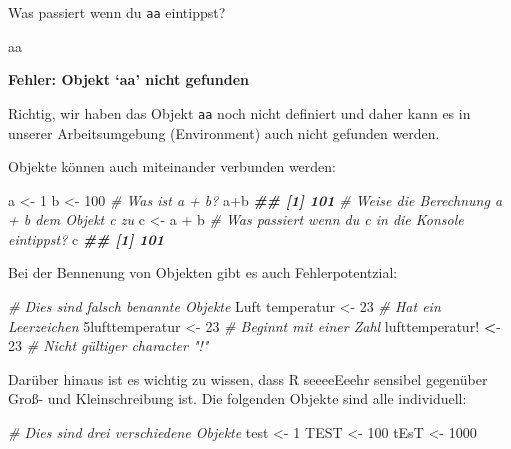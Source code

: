 \documentclass[
]{article}
\newenvironment{Shaded}{\begin{snugshade}}{\end{snugshade}}
\newcommand{\CommentTok}[1]{\textcolor[rgb]{0.56,0.35,0.01}{\textit{#1}}}
\newcommand{\DecValTok}[1]{\textcolor[rgb]{0.00,0.00,0.81}{#1}}
\newcommand{\DocumentationTok}[1]{\textcolor[rgb]{0.56,0.35,0.01}{\textbf{\textit{#1}}}}
\newcommand{\ErrorTok}[1]{\textcolor[rgb]{0.64,0.00,0.00}{\textbf{#1}}}
\newcommand{\NormalTok}[1]{#1}
\newcommand{\OtherTok}[1]{\textcolor[rgb]{0.56,0.35,0.01}{#1}}
\newcommand{\SpecialCharTok}[1]{\textcolor[rgb]{0.00,0.00,0.00}{#1}}
\begin{document}
Was passiert wenn du \texttt{aa} eintippst?

\begin{Shaded}
\begin{Highlighting}[]
\NormalTok{aa}
\end{Highlighting}
\end{Shaded}

\textbf{Fehler: Objekt `aa' nicht gefunden}

Richtig, wir haben das Objekt \texttt{aa} noch nicht definiert und daher kann es in unserer Arbeitsumgebung (Environment) auch nicht gefunden werden.

Objekte können auch miteinander verbunden werden:

\begin{Shaded}
\begin{Highlighting}[]
\NormalTok{a }\OtherTok{\textless{}{-}} \DecValTok{1}
\NormalTok{b }\OtherTok{\textless{}{-}} \DecValTok{100}
\CommentTok{\# Was ist a + b?}
\NormalTok{a}\SpecialCharTok{+}\NormalTok{b}
\DocumentationTok{\#\# [1] 101}
\CommentTok{\# Weise die Berechnung a + b dem Objekt c zu }
\NormalTok{c }\OtherTok{\textless{}{-}}\NormalTok{ a }\SpecialCharTok{+}\NormalTok{ b}
\CommentTok{\# Was passiert wenn du c in die Konsole eintippst?}
\NormalTok{c}
\DocumentationTok{\#\# [1] 101}
\end{Highlighting}
\end{Shaded}

Bei der Bennenung von Objekten gibt es auch Fehlerpotentzial:

\begin{Shaded}
\begin{Highlighting}[]
\CommentTok{\# Dies sind falsch benannte Objekte}
\NormalTok{Luft temperatur }\OtherTok{\textless{}{-}} \DecValTok{23} \CommentTok{\# Hat ein Leerzeichen}
\NormalTok{5lufttemperatur }\OtherTok{\textless{}{-}} \DecValTok{23} \CommentTok{\# Beginnt mit einer Zahl}
\NormalTok{lufttemperatur}\SpecialCharTok{!} \ErrorTok{\textless{}}\SpecialCharTok{{-}} \DecValTok{23} \CommentTok{\# Nicht gültiger character "!"}
\end{Highlighting}
\end{Shaded}

Darüber hinaus ist es wichtig zu wissen, dass R seeeeEeehr sensibel gegenüber Groß- und Kleinschreibung ist. Die folgenden Objekte sind alle individuell:

\begin{Shaded}
\begin{Highlighting}[]
\CommentTok{\# Dies sind drei verschiedene Objekte}
\NormalTok{test }\OtherTok{\textless{}{-}} \DecValTok{1}
\NormalTok{TEST }\OtherTok{\textless{}{-}} \DecValTok{100}
\NormalTok{tEsT }\OtherTok{\textless{}{-}} \DecValTok{1000}
\end{Highlighting}
\end{Shaded}
\end{document}

